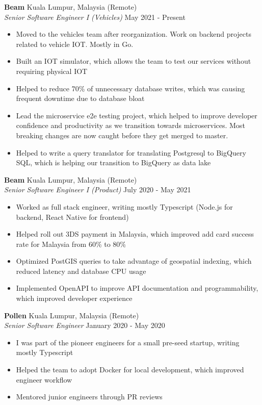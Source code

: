 \documentclass[a4paper]{article}
\begin{document}
\textbf{Beam} \hfill Kuala Lumpur, Malaysia (Remote)\\
\textit{Senior Software Engineer I (Vehicles)} \hfill May 2021 - Present\\
\vspace{-1mm}
\begin{itemize} \itemsep 1pt
	\item Moved to the vehicles team after reorganization. Work on backend projects related to vehicle IOT. Mostly in Go.
	\item Built an IOT simulator, which allows the team to test our services without requiring physical IOT
	\item Helped to reduce 70\% of unnecessary database writes, which was causing frequent downtime due to database bloat
	\item Lead the microservice e2e testing project, which helped to improve developer confidence and productivity as we transition towards microservices. Most breaking changes are now caught before they get merged to master.
	\item Helped to write a query translator for translating Postgresql to BigQuery SQL, which is helping our transition to BigQuery as data lake
\end{itemize}
\textbf{Beam} \hfill Kuala Lumpur, Malaysia (Remote)\\
\textit{Senior Software Engineer I (Product)} \hfill July 2020 - May 2021\\
\vspace{-1mm}
\begin{itemize} \itemsep 1pt
	\item Worked as full stack engineer, writing mostly Typescript (Node.js for backend, React Native for frontend)
	\item Helped roll out 3DS payment in Malaysia, which improved add card success rate for Malaysia from 60\% to 80\%
	\item Optimized PostGIS queries to take advantage of geospatial indexing, which reduced latency and database CPU usage
	\item Implemented OpenAPI to improve API documentation and programmability, which improved developer experience
\end{itemize}

\textbf{Pollen} \hfill Kuala Lumpur, Malaysia (Remote)\\
\textit{Senior Software Engineer} \hfill January 2020 - May 2020\\
\vspace{-1mm}
\begin{itemize} \itemsep 1pt
	\item I was part of the pioneer engineers for a small pre-seed startup, writing mostly Typescript
	\item Helped the team to adopt Docker for local development, which improved engineer workflow
	\item Mentored junior engineers through PR reviews
\end{itemize}
\end{document}
